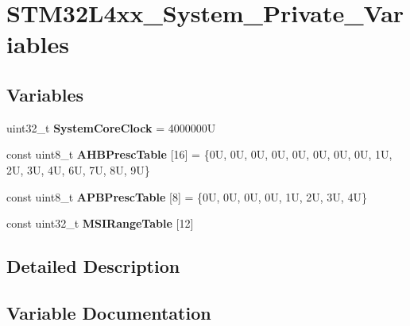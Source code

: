 \hypertarget{group___s_t_m32_l4xx___system___private___variables}{}\section{S\+T\+M32\+L4xx\+\_\+\+System\+\_\+\+Private\+\_\+\+Variables}
\label{group___s_t_m32_l4xx___system___private___variables}
\subsection*{Variables}
\begin{DoxyCompactItemize}
\item 
\mbox{\label{group___s_t_m32_l4xx___system___private___variables_gaa3cd3e43291e81e795d642b79b6088e6}} 
uint32\+\_\+t {\bfseries System\+Core\+Clock} = 4000000U
\item 
\mbox{\label{group___s_t_m32_l4xx___system___private___variables_ga6e1d9cd666f0eacbfde31e9932a93466}} 
const uint8\+\_\+t {\bfseries A\+H\+B\+Presc\+Table} \mbox{[}16\mbox{]} = \{0\+U, 0\+U, 0\+U, 0\+U, 0\+U, 0\+U, 0\+U, 0\+U, 1\+U, 2\+U, 3\+U, 4\+U, 6\+U, 7\+U, 8\+U, 9\+U\}
\item 
\mbox{\label{group___s_t_m32_l4xx___system___private___variables_ga5b4f8b768465842cf854a8f993b375e9}} 
const uint8\+\_\+t {\bfseries A\+P\+B\+Presc\+Table} \mbox{[}8\mbox{]} = \{0\+U, 0\+U, 0\+U, 0\+U, 1\+U, 2\+U, 3\+U, 4\+U\}
\item 
const uint32\+\_\+t {\bfseries M\+S\+I\+Range\+Table} \mbox{[}12\mbox{]}
\end{DoxyCompactItemize}


\subsection{Detailed Description}


\subsection{Variable Documentation}
\mbox{\label{group___s_t_m32_l4xx___system___private___variables_ga4d9e663c3c5bd4ca3361bf97d48158bf}} 
